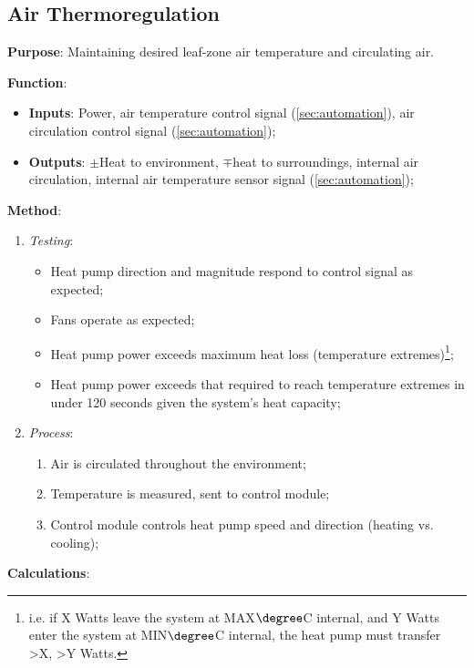 \subsection{Air Thermoregulation}
\label{sec:airthermoregulation}

\textbf{Purpose}: Maintaining desired leaf-zone air temperature and circulating air.

\textbf{Function}:
\begin{itemize}
    \item \textbf{Inputs}: Power, air temperature control signal (\ref{sec:automation}), air circulation control signal (\ref{sec:automation});
    \item \textbf{Outputs}: $\pm$Heat to environment, $\mp$heat to surroundings, internal air circulation, internal air temperature sensor signal (\ref{sec:automation});
\end{itemize}

\textbf{Method}:
\begin{enumerate}
    \item \textit{Testing}:
    \begin{itemize}
        \item Heat pump direction and magnitude respond to control signal as expected;
        \item Fans operate as expected;
        \item Heat pump power exceeds maximum heat loss (temperature extremes)\footnote{i.e. if X Watts leave the system at MAX$\degree$C internal, and Y Watts enter the system at MIN$\degree$C internal, the heat pump must transfer >X, >Y Watts.};
        \item Heat pump power exceeds that required to reach temperature extremes in under 120 seconds given the system's heat capacity;
    \end{itemize}
    \item \textit{Process}:
    \begin{enumerate}
        \item Air is circulated throughout the environment;
        \item Temperature is measured, sent to control module;
        \item Control module controls heat pump speed and direction (heating vs. cooling);
    \end{enumerate}
\end{enumerate}

\textbf{Calculations}:

